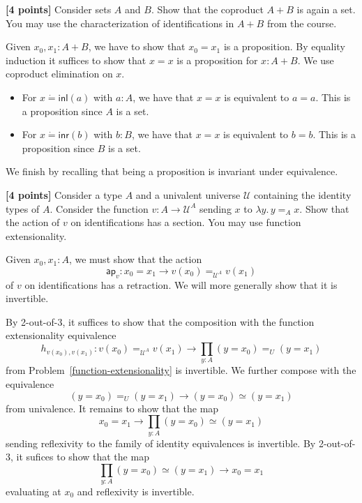 \documentclass[11pt]{article}
\newcommand{\U}{\mathcal{U}}
\newcommand{\ap}{\mathsf{ap}}
\newcommand{\judgeq}{\mathrel{\dot{=}}}
\newcommand{\inl}{\mathsf{inl}}
\newcommand{\inr}{\mathsf{inr}}
\begin{document}
\begin{problems}
\item \label{set-coproduct}
\textbf{[4 points]}
Consider sets $A$ and $B$.
Show that the coproduct $A + B$ is again a set.
You may use the characterization of identifications in $A + B$ from the course.

{\color{purple}
Given $x_0, x_1 : A + B$, we have to show that $x_0 = x_1$ is a proposition.
By equality induction it suffices to show that $x = x$ is a proposition for $x : A + B$.
We use coproduct elimination on $x$.

\begin{itemize}
\item
For $x \judgeq \inl(a)$ with $a : A$, we have that $x = x$ is equivalent to $a = a$.
This is a proposition since $A$ is a set.
\item
For $x \judgeq \inr(b)$ with $b : B$, we have that $x = x$ is equivalent to $b = b$.
This is a proposition since $B$ is a set.
\end{itemize}

We finish by recalling that being a proposition is invariant under equivalence.
}

\item \label{yoneda}
\textbf{[4 points]}
Consider a type $A$ and a univalent universe $\U$ containing the identity types of $A$.
Consider the function $v : A \to \U^A$ sending $x$ to $\lambda y.\,y =_A x$.
Show that the action of $v$ on identifications has a section.
You may use function extensionality.

{\color{purple}
Given $x_0, x_1 : A$, we must show that the action
\[
\ap_v : x_0 = x_1 \longrightarrow v(x_0) =_{\U^A} v(x_1)
\]
of $v$ on identifications has a retraction.
We will more generally show that it is invertible.

By 2-out-of-3, it suffices to show that the composition with the function extensionality equivalence
\[
h_{v(x_0), v(x_1)} : v(x_0) =_{\U^A} v(x_1) \longrightarrow \prod_{y : A} (y = x_0) =_U (y = x_1)
\]
from Problem~\ref{function-extensionality} is invertible.
We further compose with the equivalence
\[
(y = x_0) =_U (y = x_1) \longrightarrow (y = x_0) \simeq (y = x_1)
\]
from univalence.
It remains to show that the map 
\[
x_0 = x_1 \longrightarrow \prod_{y : A} (y = x_0) \simeq (y = x_1)
\]
sending reflexivity to the family of identity equivalences is invertible.
By 2-out-of-3, it sufices to show that the map
\[
\prod_{y : A} (y = x_0) \simeq (y = x_1) \longrightarrow x_0 = x_1
\]
evaluating at $x_0$ and reflexivity is invertible.

}
\end{problems}
\end{document}
